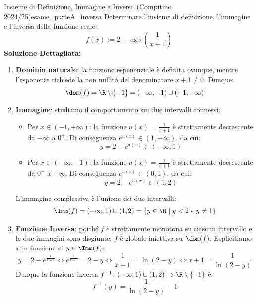 \begin{esempio}{Insieme di Definizione, Immagine e Inversa (Compitino 2024/25)}{esame_parteA_inversa}
Determinare l'insieme di definizione, l'immagine e l'inversa della funzione reale:
\[
    f(x) := 2 - \exp\left(\frac{1}{x+1}\right)
\]
\tcblower
\textbf{Soluzione Dettagliata:}
\begin{enumerate}
    \item \textbf{Dominio naturale}: la funzione esponenziale è definita ovunque, mentre l'esponente richiede la non nullità del denominatore $x+1 \neq 0$. Dunque:
    \[
        \dom(f) = \R \setminus \{-1\} = (-\infty, -1) \cup (-1, +\infty)
    \]
    \item \textbf{Immagine}: studiamo il comportamento sui due intervalli connessi:
    \begin{itemize}
        \item Per $x \in (-1, +\infty)$: la funzione $u(x) = \frac{1}{x+1}$ è strettamente decrescente da $+\infty$ a $0^+$.
        Di conseguenza $e^{u(x)} \in (1, +\infty)$, da cui:
        \[
            y = 2 - e^{u(x)} \in (-\infty, 1)
        \]
        \item Per $x \in (-\infty, -1)$: la funzione $u(x) = \frac{1}{x+1}$ è strettamente decrescente da $0^-$ a $-\infty$.
        Di conseguenza $e^{u(x)} \in (0, 1)$, da cui:
        \[
            y = 2 - e^{u(x)} \in (1, 2)
        \]
    \end{itemize}
    L'immagine complessiva è l'unione dei due intervalli:
    \[
        \Imm(f) = (-\infty, 1) \cup (1, 2) = \{y \in \R \mid y < 2 \text{ e } y \neq 1\}
    \]
    \item \textbf{Funzione Inversa}: poiché $f$ è strettamente monotona su ciascun intervallo e le due immagini sono disgiunte, $f$ è globale iniettiva su $\dom(f)$. Esplicitiamo $x$ in funzione di $y \in \Imm(f)$:
    \[
        y = 2 - e^{\frac{1}{x+1}} \iff e^{\frac{1}{x+1}} = 2 - y \iff \frac{1}{x+1} = \ln(2 - y) \iff x + 1 = \frac{1}{\ln(2 - y)}
    \]
    Dunque la funzione inversa $f^{-1} \colon (-\infty, 1) \cup (1, 2) \to \R \setminus \{-1\}$ è:
    \[
        f^{-1}(y) = \frac{1}{\ln(2 - y)} - 1
    \]
\end{enumerate}
\end{esempio}

